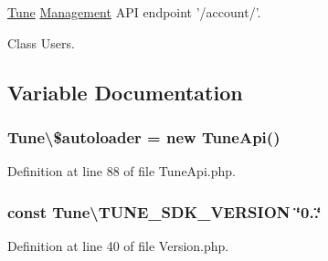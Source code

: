 \hyperlink{namespaceTune}{Tune} \hyperlink{namespaceTune_1_1Management}{Management} A\-P\-I endpoint '/account/'.

Class Users.

\subsection{Variable Documentation}
\hypertarget{namespaceTune_a45833c84db9823c05fccd9d72c991286}{
\subsubsection[{\$autoloader}]{\setlength{\rightskip}{0pt plus 5cm}Tune\textbackslash{}\$autoloader = new {\bf Tune\-Api}()}}\label{namespaceTune_a45833c84db9823c05fccd9d72c991286}


Definition at line 88 of file Tune\-Api.\-php.

\hypertarget{namespaceTune_a064a74b8093f320885e1a817c501a0cc}{
\subsubsection[{T\-U\-N\-E\-\_\-\-S\-D\-K\-\_\-\-V\-E\-R\-S\-I\-O\-N}]{\setlength{\rightskip}{0pt plus 5cm}const Tune\textbackslash{}\-T\-U\-N\-E\-\_\-\-S\-D\-K\-\_\-\-V\-E\-R\-S\-I\-O\-N \char`\"{}0..\char`\"{}}}\label{namespaceTune_a064a74b8093f320885e1a817c501a0cc}


Definition at line 40 of file Version.\-php.

